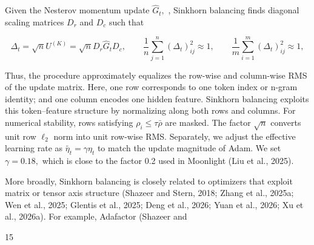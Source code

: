 \documentclass[
  10
]{article}
\begin{document}
Given the Nesterov momentum update \(\widehat { G } _ { t } ,\) ,
Sinkhorn balancing finds diagonal scaling matrices \(D _ { r }\) and
\(D _ { c }\) such that

\[
\Delta _ { t } = \sqrt { n } U ^ { ( K ) } = \sqrt { n } D _ { r } \widehat { G } _ { t } D _ { c } , \qquad \frac { 1 } { n } \sum _ { j = 1 } ^ { n } ( \Delta _ { t } ) _ { i j } ^ { 2 } \approx 1 , \qquad \frac { 1 } { m } \sum _ { i = 1 } ^ { m } ( \Delta _ { t } ) _ { i j } ^ { 2 } \approx 1 ,\tag{7}
\]

Thus, the procedure approximately equalizes the row-wise and column-wise
RMS of the update matrix. Here, one row corresponds to one token index
or n-gram identity; and one column encodes one hidden feature. Sinkhorn
balancing exploits this token--feature structure by normalizing along
both rows and columns. For numerical stability, rows satisfying
\(\rho _ { i } \leqslant \tau \bar { \rho }\) are masked. The factor
\(\sqrt { n }\) converts unit row \(\ell _ { 2 }\) norm into unit
row-wise RMS. Separately, we adjust the effective learning rate as
\(\widetilde { \eta _ { t } } = \gamma \eta _ { t }\) to match the
update magnitude of Adam. We set \(\gamma = 0 . 1 8 ,\) which is close
to the factor 0.2 used in Moonlight (Liu et al., 2025).

More broadly, Sinkhorn balancing is closely related to optimizers that
exploit matrix or tensor axis structure (Shazeer and Stern, 2018; Zhang
et al., 2025a; Wen et al., 2025; Glentis et al., 2025; Deng et al.,
2026; Yuan et al., 2026; Xu et al., 2026a). For example, Adafactor
(Shazeer and

15
\end{document}
